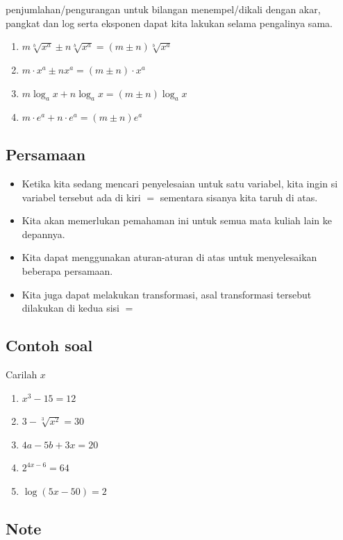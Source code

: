 \documentclass[
  letterpaper,
  DIV=11,
  numbers=noendperiod]{scrartcl}
\begin{document}
penjumlahan/pengurangan untuk bilangan menempel/dikali dengan akar,
pangkat dan log serta eksponen dapat kita lakukan selama pengalinya
sama.

\begin{enumerate}
\def\labelenumi{\arabic{enumi}.}
\item
  \(m \sqrt[b]{x^a} \pm n \sqrt[b]{x^a}=(m \pm n)\sqrt[b]{x^a}\)
\item
  \(m \cdot x^a \pm n x^a=(m \pm n)\cdot x^a\)
\item
  \(m \log_a x+n \log_a x=(m\pm n) \log_a x\)
\item
  \(m \cdot e^a+n \cdot e^a=(m\pm n) e^a\)
\end{enumerate}

\subsection{Persamaan}\label{persamaan}

\begin{itemize}
\item
  Ketika kita sedang mencari penyelesaian untuk satu variabel, kita
  ingin si variabel tersebut ada di kiri \(=\) sementara sisanya kita
  taruh di atas.
\item
  Kita akan memerlukan pemahaman ini untuk semua mata kuliah lain ke
  depannya.
\item
  Kita dapat menggunakan aturan-aturan di atas untuk menyelesaikan
  beberapa persamaan.
\item
  Kita juga dapat melakukan transformasi, asal transformasi tersebut
  dilakukan di kedua sisi \(=\)
\end{itemize}

\subsection{Contoh soal}\label{contoh-soal}

Carilah \(x\)

\begin{enumerate}
\def\labelenumi{\arabic{enumi}.}
\item
  \(x^3-15=12\)
\item
  \(3-\sqrt[3]{x^2}=30\)
\item
  \(4a-5b+3x=20\)
\item
  \(2^{4x-6}=64\)
\item
  \(\log (5x-50)=2\)
\end{enumerate}

\subsection{Note}\label{note}
\end{document}
